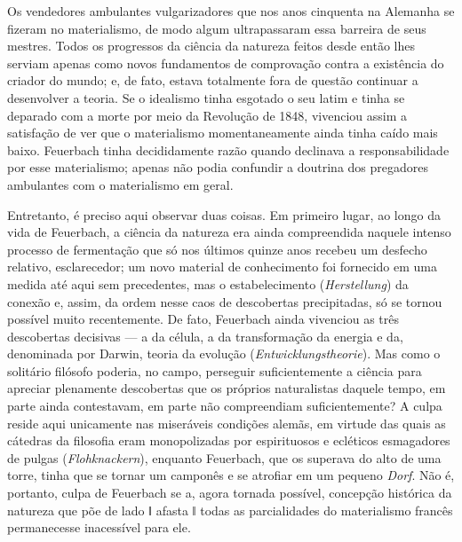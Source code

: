 Os vendedores ambulantes vulgarizadores que nos anos cinquenta na
Alemanha se fizeram no materialismo, de modo algum ultrapassaram essa
barreira de seus mestres. Todos os progressos da ciência da natureza
feitos desde então lhes serviam apenas como novos fundamentos de
comprovação contra a existência do criador do mundo; e, de fato, estava
totalmente fora de questão continuar a desenvolver a teoria. Se o
idealismo tinha esgotado o seu latim e tinha se deparado com a morte por
meio da Revolução de 1848, vivenciou assim a satisfação de ver que o
materialismo momentaneamente ainda tinha caído mais
baixo. Feuerbach tinha
decididamente razão quando declinava a responsabilidade por esse
materialismo; apenas não podia confundir a doutrina dos pregadores
ambulantes com o materialismo em geral.

Entretanto, é preciso aqui observar duas coisas. Em primeiro lugar, ao
longo da vida
de Feuerbach,
a ciência da natureza era ainda compreendida naquele intenso processo de
fermentação que só nos últimos quinze anos recebeu um desfecho relativo,
esclarecedor; um novo material de conhecimento foi fornecido em uma
medida até aqui sem precedentes, mas o estabelecimento
(\emph{Herstellung}) da conexão e, assim, da ordem nesse caos de
descobertas precipitadas, só se tornou possível muito recentemente. De
fato,
 Feuerbach ainda
vivenciou as três descobertas decisivas --- a da célula, a da
transformação da energia e da, denominada
por Darwin,
teoria da evolução (\emph{Entwicklungstheorie}). Mas como o solitário
filósofo poderia, no campo, perseguir suficientemente a ciência para
apreciar plenamente descobertas que os próprios naturalistas daquele
tempo, em parte ainda contestavam, em parte não compreendiam
suficientemente? A culpa reside aqui unicamente nas miseráveis condições
alemãs, em virtude das quais as cátedras da filosofia eram monopolizadas
por espirituosos e ecléticos esmagadores de pulgas
(\emph{Flohknackern}),
enquanto Feuerbach,
que os superava do alto de uma torre, tinha que se tornar um camponês e
se atrofiar em um pequeno \emph{Dorf}. Não é, portanto, culpa
de Feuerbach
se a, agora tornada possível, concepção histórica da natureza que põe de
lado ǁ afasta ǁ todas as parcialidades do materialismo francês
permanecesse inacessível para ele.

